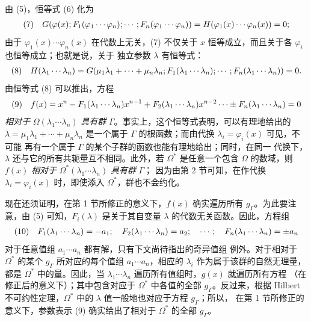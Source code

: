 由 (5)，恒等式 (6) 化为
\[
\begin{array}{@{}l@{\quad}l@{}}
(7)& \displaystyle G(\varphi(x);F_1(\varphi_1\cdots\varphi_n);\cdots;F_n(\varphi_1\cdots\varphi_n)) =H(\varphi_1(x)\cdots\varphi_n(x))=0;
\end{array}
\]
由于 $\varphi_1(x)\cdots\varphi_n(x)$ 在代数上无关，(7) 不仅关于
$x$ 恒等成立，而且关于各 $\varphi_i$ 也恒等成立；也就是说，关于
独立参数 $\lambda$ 有恒等式：
\[
\begin{array}{@{}l@{\quad}l@{}}
(8)& \displaystyle H(\lambda_1\cdots\lambda_n)=G(\mu_1\lambda_1+\cdots+\mu_n\lambda_n;F_1(\lambda_1\cdots\lambda_n);\cdots;F_n(\lambda_1\cdots\lambda_n))=0.
\end{array}
\]
由恒等式 (8) 可以推出，方程
\[
\begin{array}{@{}l@{\quad}l@{}}
(9)& \displaystyle f(x)=x^n-F_1(\lambda_1\cdots\lambda_n)x^{n-1}+F_2(\lambda_1\cdots\lambda_n)x^{n-2}\cdots\pm F_n(\lambda_1\cdots\lambda_n)=0
\end{array}
\]
\emph{相对于} $\Omega(\lambda_1\cdots\lambda_n)$ \emph{具有群}
$\Gamma$。事实上，这个恒等式表明，可以有理地给出的
$\lambda=\mu_1\lambda_1+\cdots+\mu_n\lambda_n$ 是一个属于
$\Gamma$ 的根函数；而由代换 $\lambda_i=\varphi_i(x)$ 可见，不可能
再有一个属于 $\Gamma$ 的某个子群的函数也能有理地给出；同时，在同一
代换下，$\lambda$ 还与它的所有共轭量互不相同。此外，若 $\Omega^*$
是任意一个包含 $\Omega$ 的数域，则 $f(x)$ \emph{相对于}
$\Omega^*(\lambda_1\cdots\lambda_n)$ \emph{具有群} $\Gamma$；
因为由第 2 节可知，在作代换 $\lambda_i=\varphi_i(x)$ 时，即使添入
$\Omega^*$，群也不会约化。

现在还须证明，在第 1 节所修正的意义下，$f(x)$ 确实遍历所有
$g_\Gamma$。为此要注意，由 (5) 可知，$F_i(\lambda)$ 是关于其自变量
$\lambda$ 的代数无关函数。因此，方程组
\[
\begin{array}{@{}l@{\quad}l@{}}
(10)& \displaystyle F_1(\lambda_1\cdots\lambda_n)=-a_1;\quad F_2(\lambda_1\cdots\lambda_n)=a_2;\quad \cdots;\quad F_n(\lambda_1\cdots\lambda_n)=\pm a_n
\end{array}
\]
对于任意值组 $a_1\cdots a_n$ 都有解，只有下文尚待指出的奇异值组
例外。对于相对于 $\Omega^*$ 的某个 $g_\Gamma$ 所对应的每个值组
$a_1\cdots a_n$，相应的 $\lambda_i$ 作为属于该群的自然无理量，
 都是 $\Omega^*$ 中的量。因此，当
$\lambda_1\cdots\lambda_n$ 遍历所有值组时，$g(x)$ 就遍历所有方程
（在修正后的意义下）；其中包含对应于 $\Omega^*$ 中各值的全部
$g_\Gamma$。反过来，根据 Hilbert 不可约性定理，$\Omega^*$ 中的
$\lambda$ 值\glqq{}一般地\grqq{}也对应于方程 $g_\Gamma$；所以，
在第 1 节所修正的意义下，参数表示 (9) 确实给出了相对于 $\Omega^*$
的全部 $g_\Gamma$。

